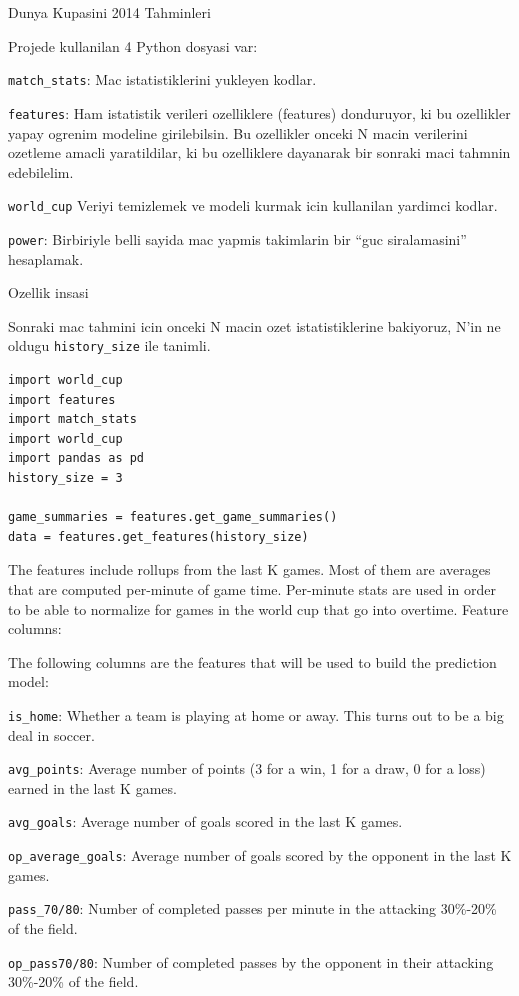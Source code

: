 \documentclass[12pt,fleqn]{article}\usepackage{common}
\begin{document}
Dunya Kupasini 2014 Tahminleri

Projede kullanilan 4 Python dosyasi var: 

\verb!match_stats!: Mac istatistiklerini yukleyen kodlar.

\verb!features!: Ham istatistik verileri ozelliklere (features) donduruyor,
ki bu ozellikler yapay ogrenim modeline girilebilsin. Bu ozellikler onceki
N macin verilerini ozetleme amacli yaratildilar, ki bu ozelliklere
dayanarak bir sonraki maci tahmnin edebilelim.

\verb!world_cup! Veriyi temizlemek ve modeli kurmak icin kullanilan
yardimci kodlar.

\verb!power!: Birbiriyle belli sayida mac yapmis takimlarin bir ``guc
siralamasini'' hesaplamak. 

Ozellik insasi

Sonraki mac tahmini icin onceki N macin ozet istatistiklerine bakiyoruz, N'in
ne oldugu \verb!history_size! ile tanimli.

\begin{verbatim}
import world_cup
import features
import match_stats
import world_cup
import pandas as pd
history_size = 3

game_summaries = features.get_game_summaries()
data = features.get_features(history_size)
\end{verbatim}

The features include rollups from the last K games. Most of them are
averages that are computed per-minute of game time. Per-minute stats are
used in order to be able to normalize for games in the world cup that go
into overtime.  Feature columns:

The following columns are the features that will be used to build the
prediction model:

\verb!is_home!: Whether a team is playing at home or away. This turns out
to be a big deal in soccer.

\verb!avg_points!: Average number of points (3 for a win, 1 for a draw, 0
for a loss) earned in the last K games.

\verb!avg_goals!: Average number of goals scored in the last K games.

\verb!op_average_goals!: Average number of goals scored by the opponent in the last K games.

\verb!pass_70/80!: Number of completed passes per minute in the attacking
30\%-20\% of the field.

\verb!op_pass70/80!: Number of completed passes by the opponent in their
attacking 30\%-20\% of the field.
\end{document}
